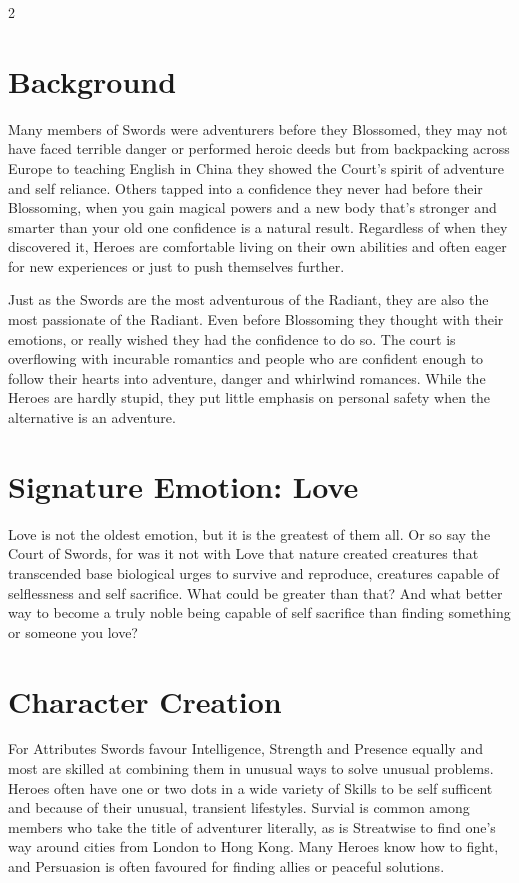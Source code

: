 \begin{multicols}{2}
\section*{Background}

Many members of Swords were adventurers before they Blossomed, they may not have faced terrible danger or performed heroic deeds but from backpacking across Europe to teaching English in China they showed the Court's spirit of adventure and self reliance. Others tapped into a confidence they never had before their Blossoming, when you gain magical powers and a new body that's stronger and smarter than your old one confidence is a natural result. Regardless of when they discovered it, Heroes are comfortable living on their own abilities and often eager for new experiences or just to push themselves further. 

Just as the Swords are the most adventurous of the Radiant, they are also the most passionate of the Radiant. Even before Blossoming they thought with their emotions, or really wished they had the confidence to do so. The court is overflowing with incurable romantics and people who are confident enough to follow their hearts into adventure, danger and whirlwind romances. While the Heroes are hardly stupid, they put little emphasis on personal safety when the alternative is an adventure. 

\section*{Signature Emotion: Love}

Love is not the oldest emotion, but it is the greatest of them all. Or so say the Court of Swords, for was it not with Love that nature created creatures that transcended base biological urges to survive and reproduce, creatures capable of selflessness and self sacrifice. What could be greater than that? And what better way to become a truly noble being capable of self sacrifice than finding something or someone you love?

\section*{Character Creation}

For Attributes Swords favour Intelligence, Strength and Presence equally and most are skilled at combining them in unusual ways to solve unusual problems. Heroes often have one or two dots in a wide variety of Skills to be self sufficent and because of their unusual, transient lifestyles. Survial is common among members who take the title of adventurer literally, as is Streatwise to find one's way around cities from London to Hong Kong. Many Heroes know how to fight, and Persuasion is often favoured for finding allies or peaceful solutions. 


\end{multicols}
